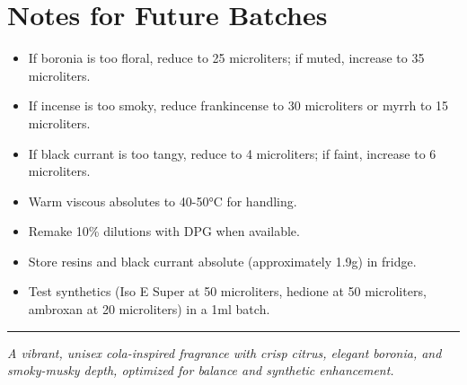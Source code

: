 \documentclass{article}
\begin{document}
\section*{Notes for Future Batches}
\begin{itemize}
  \item If boronia is too floral, reduce to 25 microliters; if muted, increase to 35 microliters.
  \item If incense is too smoky, reduce frankincense to 30 microliters or myrrh to 15 microliters.
  \item If black currant is too tangy, reduce to 4 microliters; if faint, increase to 6 microliters.
  \item Warm viscous absolutes to 40-50°C for handling.
  \item Remake 10\% dilutions with DPG when available.
  \item Store resins and black currant absolute (approximately 1.9g) in fridge.
  \item Test synthetics (Iso E Super at 50 microliters, hedione at 50 microliters, ambroxan at 20 microliters) in a 1ml batch.
\end{itemize}

\vspace{1cm}
\begin{center}
\textcolor{violetPurple}{\rule{0.8\textwidth}{0.4pt}}
\end{center}

\begin{center}
\textit{\textcolor{colaDark}{A vibrant, unisex cola-inspired fragrance with crisp citrus, elegant boronia, and smoky-musky depth, optimized for balance and synthetic enhancement.}}
\end{center}
\end{document}
